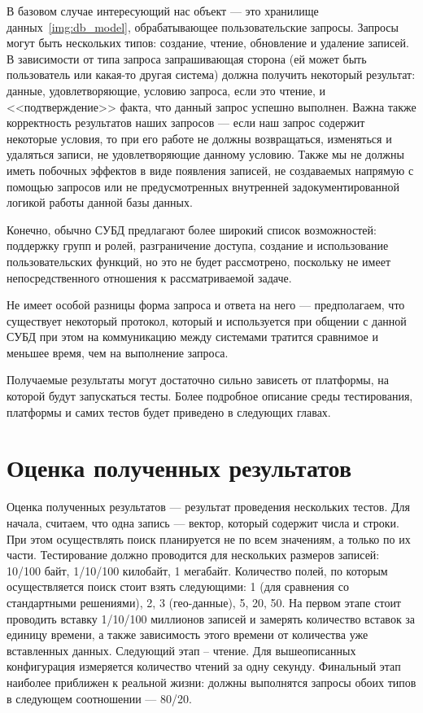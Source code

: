 В базовом случае интересующий нас объект --- это хранилище данных~\ref{img:db_model},
обрабатывающее пользовательские запросы. Запросы могут быть
нескольких типов: создание, чтение, обновление и удаление записей.
В зависимости от типа запроса запрашивающая сторона (ей может быть пользователь
или какая-то другая система) должна получить некоторый результат: данные,
удовлетворяющие, условию запроса, если это чтение, и <<подтверждение>> факта, что
данный запрос успешно выполнен.
Важна также корректность результатов наших запросов — если наш запрос
содержит некоторые условия, то при его работе не должны возвращаться,
изменяться и удаляться записи, не удовлетворяющие данному условию. Также
мы не должны иметь побочных эффектов в виде появления записей,
не создаваемых напрямую с помощью запросов или не предусмотренных внутренней
задокументированной логикой работы данной базы данных.

Конечно, обычно СУБД предлагают более широкий список возможностей:
поддержку групп и ролей, разграничение доступа, создание и использование
пользовательских функций, но это не будет рассмотрено, поскольку не имеет
непосредственного отношения к рассматриваемой задаче.

Не имеет особой разницы форма запроса и ответа на него ---
предполагаем, что существует некоторый протокол, который и используется при общении
с данной СУБД при этом на коммуникацию между системами
тратится сравнимое и меньшее время, чем на выполнение запроса.

Получаемые результаты могут достаточно сильно зависеть от платформы,
на которой будут запускаться тесты.
Более подробное описание среды тестирования, платформы и самих тестов
будет приведено в следующих главах.

\section{Оценка полученных результатов}

Оценка полученных результатов — результат проведения нескольких тестов.
Для начала, считаем, что одна запись — вектор, который содержит числа
и строки. При этом осуществлять поиск планируется не по всем значениям, а
только по их части. Тестирование должно проводится для нескольких размеров
записей: 10/100 байт, 1/10/100 килобайт, 1 мегабайт. Количество полей, по
которым осуществляется поиск стоит взять следующими: 1 (для сравнения со
стандартными решениями), 2, 3 (гео-данные), 5, 20, 50.
На первом этапе стоит проводить вставку 1/10/100 миллионов записей и
замерять количество вставок за единицу времени, а также зависимость этого
времени от количества уже вставленных данных.
Следующий этап – чтение. Для вышеописанных конфигурация измеряется
количество чтений за одну секунду.
Финальный этап наиболее приближен к реальной жизни: должны выполнятся
запросы обоих типов в следующем соотношении — 80/20.
